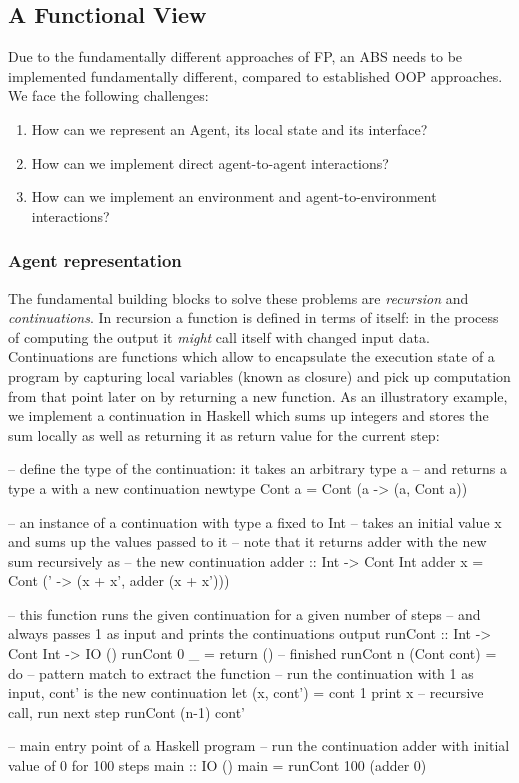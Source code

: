 \subsection{A Functional View}
Due to the fundamentally different approaches of FP, an ABS needs to be implemented fundamentally different, compared to established OOP approaches. We face the following challenges:

\begin{enumerate}
	\item How can we represent an Agent, its local state and its interface?
	\item How can we implement direct agent-to-agent interactions?
	\item How can we implement an environment and agent-to-environment interactions? 
\end{enumerate}

\subsubsection{Agent representation}
The fundamental building blocks to solve these problems are \textit{recursion} and \textit{continuations}. In recursion a function is defined in terms of itself: in the process of computing the output it \textit{might} call itself with changed input data. Continuations are functions which allow to encapsulate the execution state of a program by capturing local variables (known as closure) and pick up computation from that point later on by returning a new function. As an illustratory example, we implement a continuation in Haskell which sums up integers and stores the sum locally as well as returning it as return value for the current step:

\begin{HaskellCode}
-- define the type of the continuation: it takes an arbitrary type a 
-- and returns a type a with a new continuation
newtype Cont a = Cont (a -> (a, Cont a))

-- an instance of a continuation with type a fixed to Int
-- takes an initial value x and sums up the values passed to it
-- note that it returns adder with the new sum recursively as 
-- the new continuation
adder :: Int -> Cont Int
adder x = Cont (\x' -> (x + x', adder (x + x')))

-- this function runs the given continuation for a given number of steps
-- and always passes 1 as input and prints the continuations output
runCont :: Int -> Cont Int -> IO ()
runCont 0 _ = return () -- finished
runCont n (Cont cont) = do -- pattern match to extract the function
  -- run the continuation with 1 as input, cont' is the new continuation
  let (x, cont') = cont 1
  print x
  -- recursive call, run next step
  runCont (n-1) cont'

-- main entry point of a Haskell program
-- run the continuation adder with initial value of 0 for 100 steps 
main :: IO ()
main = runCont 100 (adder 0)
\end{HaskellCode}

